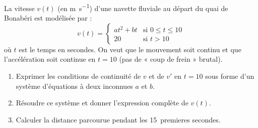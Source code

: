 \documentclass[11pt]{article}
\begin{document}
\begin{exercice}
La vitesse $v(t)$ (en \si{\meter\per\second}) d'une navette fluviale au départ du quai de Bonabéri est modélisée par :
\[
v(t) = \begin{cases}
at^2 + bt & \text{si } 0 \le t \le 10 \\[2pt]
20 & \text{si } t > 10
\end{cases}
\]
où $t$ est le temps en secondes. On veut que le mouvement soit continu et que l'accélération soit continue en $t=10$ (pas de « coup de frein » brutal).
\begin{enumerate}
\item Exprimer les conditions de continuité de $v$ et de $v'$ en $t=10$ sous forme d'un système d'équations à deux inconnues $a$ et $b$.
\item Résoudre ce système et donner l'expression complète de $v(t)$.
\item Calculer la distance parcourue pendant les \SI{15}{premieres} secondes.
\end{enumerate}
\end{exercice}
\end{document}
